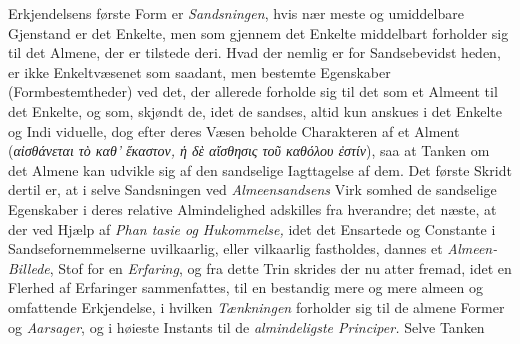 \documentclass[12pt,a4paper]{book}
\newcommand{\gk}[1]{\textit{#1}}
\begin{document}
Erkjendelsens første Form er \emph{Sandsningen}, hvis nær\-%
meste og umiddelbare Gjenstand er det Enkelte, men som
gjennem det Enkelte middelbart forholder sig til det Almene,
der er tilstede deri. Hvad der nemlig er for Sandsebevidst\-%
heden, er ikke Enkeltvæsenet som saadant, men bestemte
Egenskaber (Formbestemtheder) ved det, der allerede forholde
sig til det som et Almeent til det Enkelte, og som, skjøndt
de, idet de sandses, altid kun anskues i det Enkelte og Indi\-%
viduelle, dog efter deres Væsen beholde Charakteren af et
Alment (\gk{αἰσθάνεται τὸ καθ' ἕκαστον, ἡ δὲ αἴσθησις τοῦ
καθόλου ἐστίν}), saa at Tanken om det Almene kan udvikle
sig af den sandselige Iagttagelse af dem. Det første Skridt
dertil er, at i selve Sandsningen ved \emph{Almeensandsens} Virk\-%
somhed de sandselige Egenskaber i deres relative Almindelighed
adskilles fra hverandre; det næste, at der ved Hjælp af \emph{Phan\-%
tasie og Hukommelse,} idet det Ensartede og Constante i
Sandsefornemmelserne uvilkaarlig, eller vilkaarlig fastholdes,
dannes et \emph{Almeen-Billede}, Stof for en \emph{Erfaring}, og
fra dette Trin skrides der nu atter fremad, idet en Flerhed
af Erfaringer sammenfattes, til en bestandig mere og mere
almeen og omfattende Erkjendelse, i hvilken \emph{Tænkningen}
forholder sig til de almene Former og \emph{Aarsager}, og i høieste
Instants til de \emph{almindeligste Principer.} Selve Tanken
\end{document}
